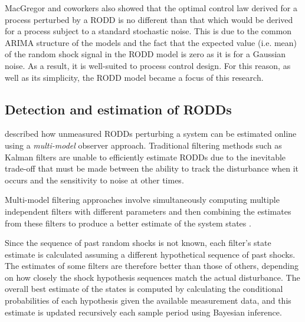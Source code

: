 MacGregor and coworkers also showed that the optimal control law derived for a process perturbed by a RODD is no different than that which would be derived for a process subject to a standard stochastic noise.  This is due to the common ARIMA structure of the models and the fact that the expected value (i.e. mean) of the random shock signal in the RODD model is zero as it is for a Gaussian noise. As a result, it is well-suited to process control design. For this reason, as well as its simplicity, the RODD model became a focus of this research.

\subsection{Detection and estimation of RODDs}\label{detection_RODDs}

\cite{robertson_detection_1995} described how unmeasured RODDs perturbing a system can be estimated online using a \textit{multi-model} observer approach. Traditional filtering methods such as Kalman filters are unable to efficiently estimate RODDs due to the inevitable trade-off that must be made between the ability to track the disturbance when it occurs and the sensitivity to noise at other times.

Multi-model filtering approaches involve simultaneously computing multiple independent filters with different parameters and then combining the estimates from these filters to produce a better estimate of the system states \citep{jaffer_estimation_1971, buxbaum_recursive_1969, tugnait_detection_1982}.

Since the sequence of past random shocks is not known, each filter's state estimate is calculated assuming a different hypothetical sequence of past shocks. The estimates of some filters are therefore better than those of others, depending on how closely the shock hypothesis sequences match the actual disturbance. The overall best estimate of the states is computed by calculating the conditional probabilities of each hypothesis given the available measurement data, and this estimate is updated recursively each sample period using Bayesian inference.

